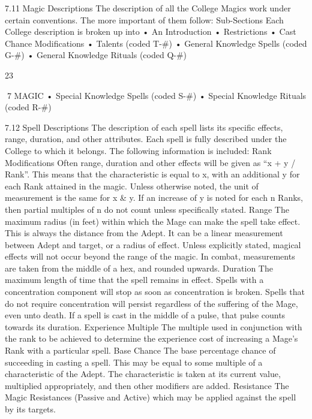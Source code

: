 \documentclass[a4paper]{article}
\begin{document}
\begin{multicols}{3}
7.11 Magic Descriptions
The description of all the College Magics work
under certain conventions. The more important of
them follow:
Sub-Sections
Each College description is broken up into
• An Introduction
• Restrictions
• Cast Chance Modifications
• Talents (coded T-#)
• General Knowledge Spells (coded G-#)
• General Knowledge Rituals (coded Q-#)

23

7 MAGIC
• Special Knowledge Spells (coded S-#)
• Special Knowledge Rituals (coded R-#)

7.12 Spell Descriptions
The description of each spell lists its specific effects, range, duration, and other attributes. Each
spell is fully described under the College to which
it belongs. The following information is included:
Rank Modifications Often range, duration and
other effects will be given as “x + y / Rank”. This
means that the characteristic is equal to x, with an
additional y for each Rank attained in the magic.
Unless otherwise noted, the unit of measurement is
the same for x & y. If an increase of y is noted for
each n Ranks, then partial multiples of n do not
count unless specifically stated.
Range The maximum radius (in feet) within which
the Mage can make the spell take effect. This is
always the distance from the Adept. It can be a
linear measurement between Adept and target, or a
radius of effect. Unless explicitly stated, magical
effects will not occur beyond the range of the
magic. In combat, measurements are taken from
the middle of a hex, and rounded upwards.
Duration The maximum length of time that the
spell remains in effect. Spells with a concentration
component will stop as soon as concentration is
broken. Spells that do not require concentration
will persist regardless of the suffering of the Mage,
even unto death. If a spell is cast in the middle of a
pulse, that pulse counts towards its duration.
Experience Multiple The multiple used in conjunction with the rank to be achieved to determine
the experience cost of increasing a Mage’s Rank
with a particular spell.
Base Chance The base percentage chance of succeeding in casting a spell. This may be equal to
some multiple of a characteristic of the Adept. The
characteristic is taken at its current value, multiplied appropriately, and then other modifiers are
added.
Resistance The Magic Resistances (Passive and
Active) which may be applied against the spell by
its targets.


\end{multicols}
\end{document}
